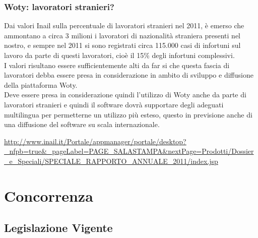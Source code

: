 \subsection{Woty: lavoratori stranieri?}
Dai valori Inail sulla percentuale di lavoratori stranieri nel 2011, è emerso che ammontano a circa 3 milioni i lavoratori di nazionalità straniera presenti nel nostro, e sempre nel 2011 si sono registrati circa 115.000 casi di infortuni sul lavoro da parte di questi lavoratori, cioè il 15\% degli infortuni complessivi.\\
I valori risultano essere sufficientemente alti da far si che questa fascia di lavoratori debba essere presa in considerazione in ambito di sviluppo e diffusione della piattaforma Woty.\\
Deve essere presa in considerazione quindi l'utilizzo di Woty anche da parte di lavoratori stranieri e quindi il software dovrà supportare degli adeguati multilingua per permetterne un utilizzo più esteso, questo in previsione anche di una diffusione del software su scala internazionale.





\url{http://www.inail.it/Portale/appmanager/portale/desktop?_nfpb=true&_pageLabel=PAGE_SALASTAMPA&nextPage=Prodotti/Dossier_e_Speciali/SPECIALE_RAPPORTO_ANNUALE_2011/index.jsp}



















\chapter{Concorrenza}

\section{Legislazione Vigente}

